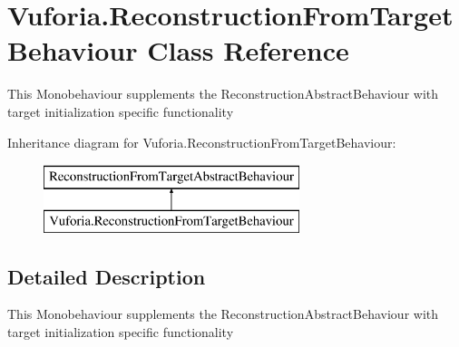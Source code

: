 \hypertarget{class_vuforia_1_1_reconstruction_from_target_behaviour}{}\section{Vuforia.\+Reconstruction\+From\+Target\+Behaviour Class Reference}
\label{class_vuforia_1_1_reconstruction_from_target_behaviour}


This Monobehaviour supplements the Reconstruction\+Abstract\+Behaviour with target initialization specific functionality  


Inheritance diagram for Vuforia.\+Reconstruction\+From\+Target\+Behaviour\+:\begin{figure}[H]
\begin{center}
\leavevmode
\includegraphics[height=2.000000cm]{class_vuforia_1_1_reconstruction_from_target_behaviour}
\end{center}
\end{figure}


\subsection{Detailed Description}
This Monobehaviour supplements the Reconstruction\+Abstract\+Behaviour with target initialization specific functionality 

